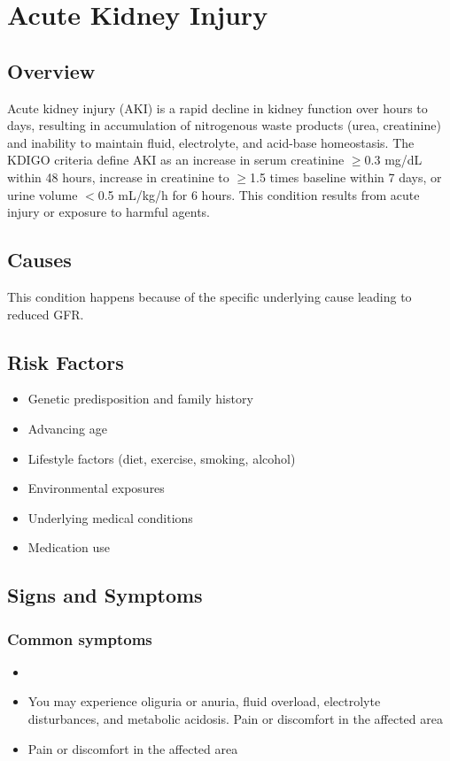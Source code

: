 \chapter{Acute Kidney Injury}
\label{sec:Acute Kidney Injury}

\section{Overview}
Acute kidney injury (AKI) is a rapid decline in kidney function over hours to days, resulting in accumulation of nitrogenous waste products (urea, creatinine) and inability to maintain fluid, electrolyte, and acid-base homeostasis. The KDIGO criteria define AKI as an increase in serum creatinine $\geq$0.3 mg/dL within 48 hours, increase in creatinine to $\geq$1.5 times baseline within 7 days, or urine volume $<$0.5 mL/kg/h for 6 hours. This condition results from acute injury or exposure to harmful agents.
\section{Causes}
This condition happens because of the specific underlying cause leading to reduced GFR.     
\section{Risk Factors}

\begin{itemize}[noitemsep]
  \item Genetic predisposition and family history
  \item Advancing age
  \item Lifestyle factors (diet, exercise, smoking, alcohol)
  \item Environmental exposures
  \item Underlying medical conditions
  \item Medication use
\end{itemize}
\section{Signs and Symptoms}

\subsection{Common symptoms}
\begin{itemize}[noitemsep]
  \item \item You may experience oliguria or anuria, fluid overload, electrolyte disturbances, and metabolic acidosis. Pain or discomfort in the affected area    \item Pain or discomfort in the affected area
  \end{itemize}

